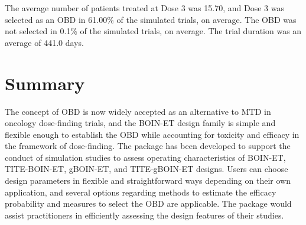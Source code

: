 The average number of patients treated at Dose 3 was 15.70, and Dose 3 was selected as an OBD in 61.00\% of the simulated trials, on average. The OBD was not selected in 0.1\% of the simulated trials, on average. The trial duration was an average of 441.0 days.

\section{Summary}
The concept of OBD is now widely accepted as an alternative to MTD in oncology dose-finding trials, and the BOIN-ET design family is simple and flexible enough to establish the OBD while accounting for toxicity and efficacy in the framework of dose-finding. The  package has been developed to support the conduct of simulation studies to assess operating characteristics of BOIN-ET, TITE-BOIN-ET, gBOIN-ET, and TITE-gBOIN-ET designs. Users can choose design parameters in flexible and straightforward ways depending on their own application, and several options regarding methods to estimate the efficacy probability and measures to select the OBD are applicable. The package would assist practitioners in efficiently assessing the design features of their studies.



\address{Yusuke Yamaguchi\\
  Quantitative Sciences and Evidence Generation, Astellas Pharma Global Development, Inc.\\
  2375 Waterview Drive, Northbrook, Illinois 60062\\
  United States\\
  }

\address{Kentaro Takeda\\
  Quantitative Sciences and Evidence Generation, Astellas Pharma Global Development, Inc.\\
  2375 Waterview Drive, Northbrook, Illinois 60062\\
  United States\\
  }

\address{Kazushi Maruo\\
  Department of Biostatistics, Faculty of Medicine, University of Tsukuba\\
  1-1-1, Tennodai, Tsukuba, Ibaraki 305-8577\\
  Japan\\
  }

